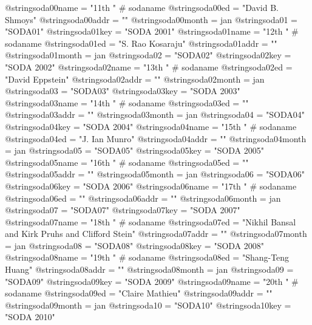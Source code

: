 @string{soda00name =            "11th " # sodaname}
@string{soda00ed =              "David B. Shmoys"}
@string{soda00addr =            ""}
@string{soda00month =           jan}
@string{soda01 =                "SODA01"}
@string{soda01key =             "SODA 2001"}
@string{soda01name =            "12th " # sodaname}
@string{soda01ed =              "S. Rao Kosaraju"}
@string{soda01addr =            ""}
@string{soda01month =           jan}
@string{soda02 =                "SODA02"}
@string{soda02key =             "SODA 2002"}
@string{soda02name =            "13th " # sodaname}
@string{soda02ed =              "David Eppstein"}
@string{soda02addr =            ""}
@string{soda02month =           jan}
@string{soda03 =                "SODA03"}
@string{soda03key =             "SODA 2003"}
@string{soda03name =            "14th " # sodaname}
@string{soda03ed =              ""}
@string{soda03addr =            ""}
@string{soda03month =           jan}
@string{soda04 =                "SODA04"}
@string{soda04key =             "SODA 2004"}
@string{soda04name =            "15th " # sodaname}
@string{soda04ed =              "J. Ian Munro"}
@string{soda04addr =            ""}
@string{soda04month =           jan}
@string{soda05 =                "SODA05"}
@string{soda05key =             "SODA 2005"}
@string{soda05name =            "16th " # sodaname}
@string{soda05ed =              ""}
@string{soda05addr =            ""}
@string{soda05month =           jan}
@string{soda06 =                "SODA06"}
@string{soda06key =             "SODA 2006"}
@string{soda06name =            "17th " # sodaname}
@string{soda06ed =              ""}
@string{soda06addr =            ""}
@string{soda06month =           jan}
@string{soda07 =                "SODA07"}
@string{soda07key =             "SODA 2007"}
@string{soda07name =            "18th " # sodaname}
@string{soda07ed =              "Nikhil Bansal and Kirk Pruhs and Clifford Stein"}
@string{soda07addr =            ""}
@string{soda07month =           jan}
@string{soda08 =                "SODA08"}
@string{soda08key =             "SODA 2008"}
@string{soda08name =            "19th " # sodaname}
@string{soda08ed =              "Shang-Teng Huang"}
@string{soda08addr =            ""}
@string{soda08month =           jan}
@string{soda09 =                "SODA09"}
@string{soda09key =             "SODA 2009"}
@string{soda09name =            "20th " # sodaname}
@string{soda09ed =              "Claire Mathieu"}
@string{soda09addr =            ""}
@string{soda09month =           jan}
@string{soda10 =                "SODA10"}
@string{soda10key =             "SODA 2010"}

